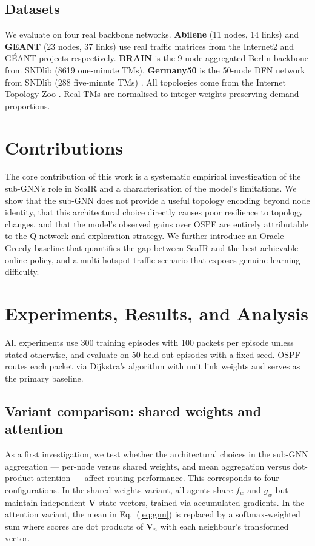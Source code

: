 \documentclass[10pt,twocolumn,letterpaper]{article}
\begin{document}
\subsection{Datasets}

We evaluate on four real backbone networks. \textbf{Abilene} (11 nodes,
14 links) and \textbf{GEANT} (23 nodes, 37 links) use real traffic
matrices from the Internet2 and GÉANT projects respectively.
\textbf{BRAIN} is the 9-node aggregated Berlin backbone from SNDlib
(8619 one-minute TMs). \textbf{Germany50} is the 50-node DFN network
from SNDlib (288 five-minute TMs) \cite{sndlib}. All topologies come
from the Internet Topology Zoo \cite{knight2011}. Real TMs are
normalised to integer weights preserving demand proportions.

\section{Contributions}

The core contribution of this work is a systematic empirical
investigation of the sub-GNN's role in ScaIR and a characterisation of
the model's limitations. We show that the sub-GNN does not provide a
useful topology encoding beyond node identity, that this architectural
choice directly causes poor resilience to topology changes, and that the
model's observed gains over OSPF are entirely attributable to the
Q-network and exploration strategy. We further introduce an Oracle
Greedy baseline that quantifies the gap between ScaIR and the best
achievable online policy, and a multi-hotspot traffic scenario that
exposes genuine learning difficulty.

\section{Experiments, Results, and Analysis}

All experiments use 300 training episodes with 100 packets per episode
unless stated otherwise, and evaluate on 50 held-out episodes with a
fixed seed. OSPF routes each packet via Dijkstra's algorithm with unit
link weights and serves as the primary baseline.

\subsection{Variant comparison: shared weights and attention}

As a first investigation, we test whether the architectural choices in
the sub-GNN aggregation — per-node versus shared weights, and mean
aggregation versus dot-product attention — affect routing performance.
This corresponds to four configurations. In the shared-weights variant,
all agents share $f_w$ and $g_w$ but maintain independent $\mathbf{V}$
state vectors, trained via accumulated gradients. In the attention
variant, the mean in Eq.~(\ref{eq:gnn}) is replaced by a
softmax-weighted sum where scores are dot products of $\mathbf{V}_n$
with each neighbour's transformed vector.
\end{document}
